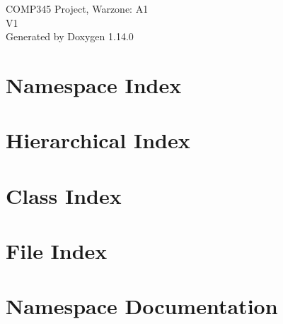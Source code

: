 \documentclass[twoside]{book}
\newcommand{\+}{\discretionary{\mbox{\scriptsize$\hookleftarrow$}}{}{}}
\newcommand{\clearemptydoublepage}{%
    \newpage{\pagestyle{empty}\cleardoublepage}%
  }
\begin{document}
  \raggedbottom
    \hypersetup{pageanchor=false,
                bookmarksnumbered=true,
                pdfencoding=unicode
               }
  \begin{titlepage}
  \vspace*{7cm}
  \begin{center}%
  {\Large COMP345 Project, Warzone\+: A1}\\
  [1ex]\large V1 \\
  \vspace*{1cm}
  {\large Generated by Doxygen 1.14.0}\\
  \end{center}
  \end{titlepage}
  \clearemptydoublepage
  \tableofcontents
  \clearemptydoublepage
  \hypersetup{pageanchor=true}
\chapter{Namespace Index}

\chapter{Hierarchical Index}

\chapter{Class Index}

\chapter{File Index}

\chapter{Namespace Documentation}





\end{document}
